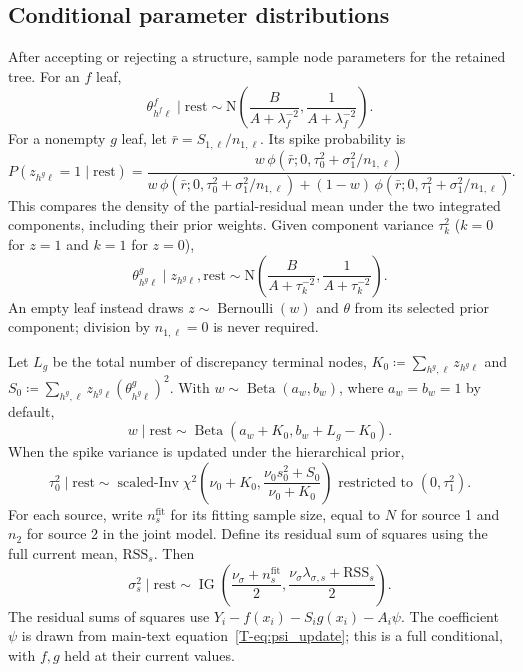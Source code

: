 \documentclass[11pt]{article}
\newcommand{\N}{\mathrm{N}}
\newcommand{\IG}{\operatorname{IG}}
\theoremstyle{remark}\newtheorem{remark}{Remark}[section]
\providecommand{\DIFaddtex}[1]{{\protect\color{blue} \sf #1}} %
\providecommand{\DIFaddbegin}{} %
\providecommand{\DIFaddend}{} %
\providecommand{\DIFadd}[1]{\texorpdfstring{\DIFaddtex{#1}}{#1}} %
\begin{document}
\subsection{Conditional parameter distributions}\label{sec:A.5}
After accepting or rejecting a structure, sample node parameters for the retained tree. For an $f$ leaf,
\begin{equation}
\theta^f_{h^f\ell}\mid\text{rest}\sim
\N\!\left(\frac{B}{A+\lambda_f^{-2}},\frac{1}{A+\lambda_f^{-2}}\right).
\end{equation}
For a nonempty $g$ leaf,  \DIFaddbegin \DIFadd{let $\bar r=S_{1,\ell}/n_{1,\ell}$. Its }\DIFaddend spike probability is
\begin{equation}\label{eq:spikeposterior}
P(z_{h^g\ell}=1\mid\text{rest})=
\frac{w\,\phi(\bar r;0,\tau_0^2+\sigma_1^2/n_{1,\ell})}{w\,\phi(\bar r;0,\tau_0^2+\sigma_1^2/n_{1,\ell})+(1-w)\,\phi(\bar r;0,\tau_1^2+\sigma_1^2/n_{1,\ell})}.
\end{equation}
This compares the density of the partial-residual mean under the two integrated components, including their prior weights. Given component variance $\tau_k^2$ ($k=0$ for $z=1$ and $k=1$ for $z=0$),
\begin{equation}
\theta^g_{h^g\ell}\mid z_{h^g\ell},\text{rest}\sim
\N\!\left(\frac{B}{A+\tau_k^{-2}},\frac{1}{A+\tau_k^{-2}}\right).
\end{equation}
An empty leaf instead draws $z\sim\operatorname{Bernoulli}(w)$ and $\theta$ from its selected prior component; division by $n_{1,\ell}=0$ is never required.

Let $L_g$ be the total number of discrepancy terminal nodes, $K_0\coloneqq \sum_{h^g,\ell}z_{h^g\ell}$ and $S_0\coloneqq \sum_{h^g,\ell}z_{h^g\ell}(\theta^g_{h^g\ell})^2$. With $w\sim\operatorname{Beta}(a_w,b_w)$, where $a_w=b_w=1$ by default,
\begin{equation}
w\mid\text{rest}\sim\operatorname{Beta}(a_w+K_0,b_w+L_g-K_0).
\end{equation}
When the spike variance is updated under the hierarchical prior,
\begin{equation}
\tau_0^2\mid\text{rest}\sim
\operatorname{scaled\text{-}Inv}\chi^2\!\left(
\nu_0+K_0,\frac{\nu_0s_0^2+S_0}{\nu_0+K_0}\right)
\text{ restricted to }(0,\tau_1^2).
\end{equation}
For each  \DIFaddbegin \DIFadd{source, write $n_s^{\mathrm{fit}}$ for its fitting sample size, equal to $N$ for source 1 and $n_2$ for source 2 in the joint model. Define }\DIFaddend its residual sum of squares using the full current mean, $\mathrm{RSS}_{s}$. Then
 \DIFaddbegin \begin{equation}
\sigma_{s}^2\mid\text{rest}\sim
\IG\left(\frac{\nu_\sigma+n_s^{\mathrm{fit}}}{2},\frac{\nu_\sigma\lambda_{\sigma,s}+\mathrm{RSS}_{s}}{2}\right).
\end{equation}\DIFaddend 
The  \DIFaddbegin \DIFadd{residual sums of squares use $Y_i-f(x_i)-S_i g(x_i)-A_i\psi$. The coefficient $\psi$ is drawn from main-text equation~\eqref{T-eq:psi_update}; this is a full conditional, with $f,g$ held at their current values.
}\DIFaddend 
\end{document}
